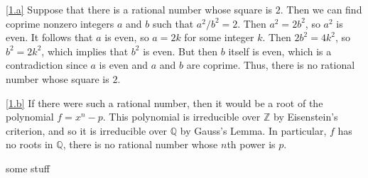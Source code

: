 \documentclass[boxes]{homework}
\begin{document}
\begin{problem}
\end{problem}

\begin{solution}
    \ref{1.a}
    Suppose that there is a rational number whose square is $2$.
    Then we can find coprime nonzero integers $a$ and $b$ such that $a^2 / b^2 = 2$.
    Then $a^2 = 2 b^2$, so $a^2$ is even.
    It follows that $a$ is even, so $a = 2 k$ for some integer $k$.
    Then $2 b^2 = 4 k^2$, so $b^2 = 2 k^2$, which implies that $b^2$ is even.
    But then $b$ itself is even, which is a contradiction since $a$ is even and $a$
    and $b$ are coprime.
    Thus, there is no rational number whose square is $2$.

    \ref{1.b}
    If there were such a rational number, then it would be a root of the polynomial
    $f = x^n - p$.
    This polynomial is irreducible over $\mathbb{Z}$ by Eisenstein's criterion, and
    so it is irreducible over $\mathbb{Q}$ by Gauss's Lemma.
    In particular, $f$ has no roots in $\mathbb Q$, there is no rational number
    whose $n$th power is $p$.
\end{solution}

\begin{mytheo}{}
    some stuff
\end{mytheo}
\end{document}
